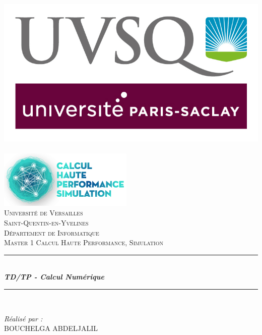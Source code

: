 \documentclass[12pt]{report}
\author{\ }
\title{\ }
\begin{document}
  
  \begin{titlepage}
   \begin{sffamily}
    \begin{center}
     
     
     \includegraphics[scale=0.25]{Lg4.png}~\\
     \includegraphics[scale=0.55]{Lg5.png}~\\[1.9cm]
     
     \textsc{\LARGE Université de Versailles}\\[0.1cm]
     \textsc{\LARGE Saint-Quentin-en-Yvelines}\\ 
     \textsc{Département de Informatique}\\[1.8cm]
     
    \textsc{\Large Master 1 Calcul Haute Performance, Simulation}\\[1.9cm]
    

     
     \rule{0.75\textwidth}{2pt}\\[0.1cm]
     \emph{\textbf{\large TD/TP - Calcul Numérique}}\\ 
     \rule{0.75\textwidth}{2pt}\\[1.3cm]
     

     \begin{minipage}{0.4\textwidth}
      \begin{flushleft} \large
       \textit{\Large Réalisé par :} \\
       \textsc{\normalsize BOUCHELGA ABDELJALIL}\\
      

\end{flushleft}
\end{minipage}
\end{center}
\end{sffamily}
\end{titlepage}
\end{document}
